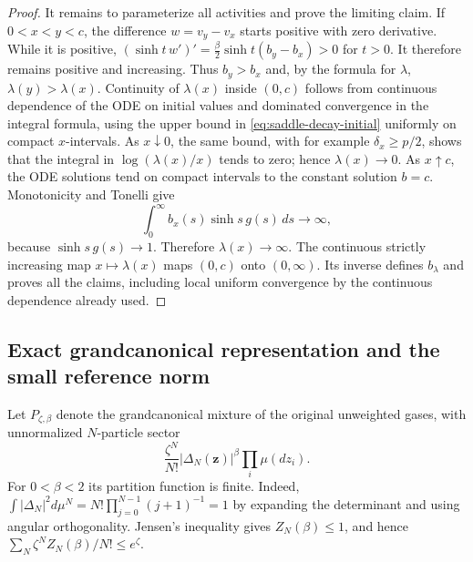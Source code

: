 \documentclass[11pt]{article}
\theoremstyle{remark}\newtheorem{remark}[theorem]{Remark}
\begin{document}
\begin{proof}
It remains to parameterize all activities and prove the limiting claim.
If $0<x<y<c$, the difference $w=v_y-v_x$ starts positive with zero
derivative.  While it is positive,
$(\sinh t\,w')'=\frac\beta2\sinh t(b_y-b_x)>0$ for $t>0$.
It therefore remains positive and increasing.  Thus $b_y>b_x$ and,
by the formula for $\lambda$, $\lambda(y)>\lambda(x)$.
Continuity of $\lambda(x)$ inside $(0,c)$ follows from continuous
dependence of the ODE on initial values and dominated convergence in
the integral formula, using the upper bound in
\eqref{eq:saddle-decay-initial} uniformly on compact $x$-intervals.
As $x\downarrow0$, the same bound, with for example
$\delta_x\ge p/2$, shows that the integral in $\log(\lambda(x)/x)$
tends to zero; hence $\lambda(x)\to0$.
As $x\uparrow c$, the ODE solutions tend on compact intervals to
the constant solution $b=c$.  Monotonicity and Tonelli give
\[
 \int_0^\infty b_x(s)\sinh s\,g(s)\,ds\longrightarrow\infty,
\]
because $\sinh s\,g(s)\to1$.  Therefore $\lambda(x)\to\infty$.
The continuous strictly increasing map $x\mapsto\lambda(x)$ maps
$(0,c)$ onto $(0,\infty)$.  Its inverse defines $b_\lambda$ and
proves all the claims, including local uniform convergence by the
continuous dependence already used.
\end{proof}

\subsection{Exact grandcanonical representation and the small reference norm}

Let $P_{\zeta,\beta}$ denote the grandcanonical mixture of the original
unweighted gases, with unnormalized $N$-particle sector
\[
 \frac{\zeta^N}{N!}|\Delta_N(\mathbf z)|^\beta\prod_i\mu(dz_i).
\]
For $0<\beta<2$ its partition function is finite.  Indeed,
$\int|\Delta_N|^2d\mu^N=N!\prod_{j=0}^{N-1}(j+1)^{-1}=1$
by expanding the determinant and using angular orthogonality.  Jensen's
inequality gives $Z_N(\beta)\le1$, and hence
$\sum_N\zeta^NZ_N(\beta)/N!\le e^\zeta$.
\end{document}
